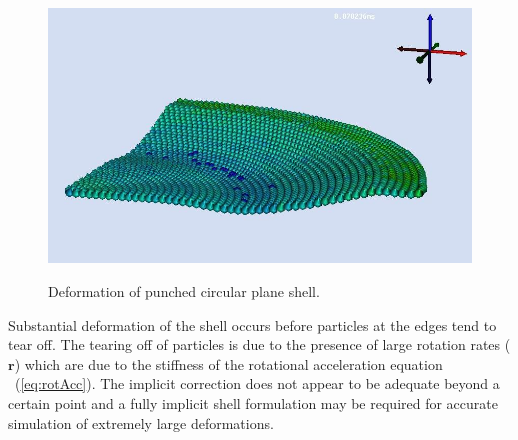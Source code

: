 \begin{figure}[htpb!]
\begin{center}
{                       \includegraphics{./Figs/shell_mpm/ps8.jpg}}
      \end{center}
      \caption{Deformation of punched circular plane shell.}
      \label{fig:planeShell}
    \end{figure}
    Substantial deformation of the shell occurs
    before particles at the edges tend to tear off.  The tearing off of 
    particles is due to the presence of large rotation rates ($\mathbf{r}$)
    which are due to the stiffness of the rotational acceleration equation
    ~(\ref{eq:rotAcc}).  The implicit correction does not appear to be
    adequate beyond a certain point and a fully implicit shell formulation
    may be required for accurate simulation of extremely large deformations.

